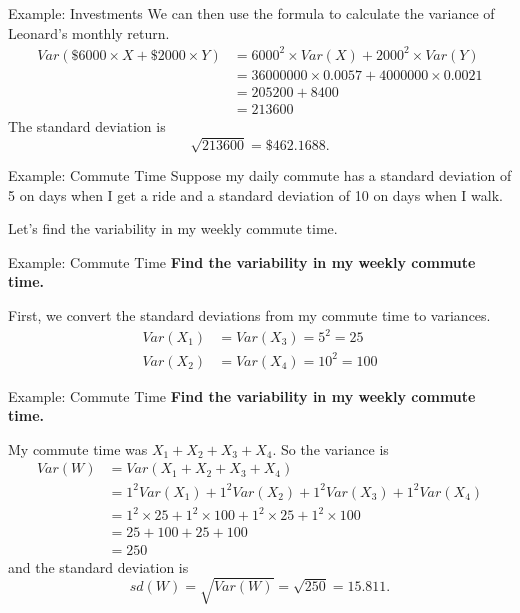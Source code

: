 \begin{frame}{Example: Investments}
    We can then use the formula to calculate the variance of Leonard's monthly return. 
    \begin{align*}
        Var(\$6000\times X + \$2000\times Y) &= 6000^2\times Var(X) + 2000^2 \times Var(Y) \\
        &= 36000000 \times 0.0057 + 4000000 \times 0.0021 \\
        &= 205200 + 8400 \\
        &= 213600
    \end{align*}
    The standard deviation is
    \[
    \sqrt{213600} = \$462.1688.
    \]
\end{frame}

\begin{frame}{Example: Commute Time}
    Suppose my daily commute has a standard deviation of 5 on days when I get a ride and a standard deviation of 10 on days when I walk.
    
    \vspace{12pt}Let's find the variability in my weekly commute time.
\end{frame}

\begin{frame}{Example: Commute Time}
    \textbf{Find the variability in my weekly commute time.}
    
    \vspace{12pt}First, we convert the standard deviations from my commute time to variances. 
    \begin{align*}
        Var(X_1)&=Var(X_3)=5^2=25 \\
        Var(X_2)&=Var(X_4)=10^2=100
    \end{align*}
\end{frame}

\begin{frame}{Example: Commute Time}
    \textbf{Find the variability in my weekly commute time.}
    
    \vspace{12pt}My commute time was $X_1+X_2+X_3+X_4$. So the variance is
    \small{\begin{align*}
        Var(W) &= Var(X_1+X_2+X_3+X_4) \\ 
        &= 1^2Var(X_1) + 1^2Var(X_2) + 1^2Var(X_3) + 1^2Var(X_4) \\
        &= 1^2\times 25 + 1^2\times 100 + 1^2\times 25 + 1^2\times 100 \\
        &= 25+100+25+100 \\
        &= 250
    \end{align*}}
    and the standard deviation is 
    \[
        sd(W) = \sqrt{Var(W)}=\sqrt{250}=15.811.
    \]
\end{frame}


